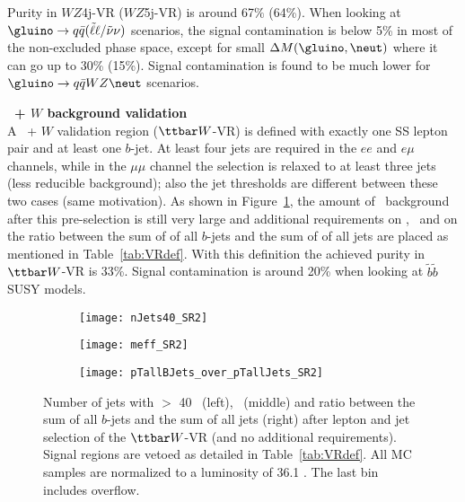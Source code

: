 Purity in $WZ$4j-VR ($WZ$5j-VR) is around 67$\%$ (64\%). When looking at $\gluino \rightarrow q \bar q (\tilde \ell \ell / \tilde \nu \nu)$ scenarios, the signal contamination is below 5\% in most of the non-excluded phase space, except for small $\Delta M(\gluino,\neut)$ where it can go up to 30\% (15\%). Signal contamination is found to be much lower for $\gluino \rightarrow q \bar q WZ \neut$ scenarios.



\par{\bf \ttbar\ + $W$ background validation\\}
A \ttbar\ + $W$ validation region ($\ttbar W$-VR) is defined with exactly one SS lepton pair and at least one $b$-jet. At least four jets are required in the $ee$ and $e\mu$ channels, while in the $\mu\mu$ channel the selection is relaxed to at least three jets  (less reducible background); also the jet \pt thresholds are different between these two cases (same motivation). As shown in Figure~\ref{fig:ttW_VR_afterLepJetSel}, the amount of \ttbar\ background after this pre-selection is still very large and additional requirements on \met, \meff\ and on the ratio between the sum of \pt of all $b$-jets and the sum of \pt of all jets are placed as mentioned in Table~\ref{tab:VRdef}. With this definition the achieved purity in $\ttbar W$-VR is 33\%. 
Signal contamination is around 20\% when looking at $\tilde b\tilde b$ SUSY 
models.

\begin{figure}[t!]
\centering
\begin{subfigure}[t]{0.32\textwidth}
\texttt{[image: nJets40\_SR2]}
\end{subfigure}
\begin{subfigure}[t]{0.32\textwidth}
\texttt{[image: meff\_SR2]}
\end{subfigure}
\begin{subfigure}[t]{0.32\textwidth}
\texttt{[image: pTallBJets\_over\_pTallJets\_SR2]}
\end{subfigure}
\caption{Number of jets with \pt $>$ 40 \GeV~(left), \meff\ (middle) and ratio between the sum of all $b$-jets \pt and the sum of all jets \pt (right) after lepton and jet selection of the $\ttbar W$-VR (and no additional requirements). Signal regions are vetoed as detailed in Table~\ref{tab:VRdef}. All MC samples are normalized to a luminosity of 36.1 \ifb. The last bin includes overflow.
}
\label{fig:ttW_VR_afterLepJetSel}
\end{figure} 

